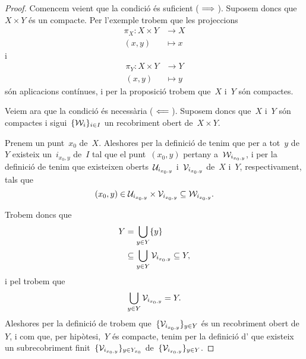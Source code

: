 \documentclass[../../main.tex]{subfiles}
\begin{document}
    \begin{proof}
        Comencem veient que la condició és suficient (\(\implies\)).
        Suposem doncs que~\(X\times Y\) és un compacte.
        Per l'exemple  trobem que les projeccions
        \begin{align*}
            \pi_{X}\colon X\times Y&\longrightarrow X \\
            (x,y)&\longmapsto x
        \end{align*}
        i
        \begin{align*}
            \pi_{Y}\colon X\times Y&\longrightarrow Y \\
            (x,y)&\longmapsto y
        \end{align*}
        són aplicacions contínues, i per la proposició  trobem que~\(X\) i~\(Y\) són compactes.

        Veiem ara que la condició és necessària (\(\impliedby\)).
        Suposem doncs que~\(X\) i~\(Y\) són compactes i sigui~\(\{\mathcal{W}_{i}\}_{i\in I}\) un recobriment obert de~\(X\times Y\).

        Prenem un punt~\(x_{0}\) de~\(X\).
        Aleshores per la definició de  tenim que per a tot~\(y\) de~\(Y\) existeix un~\(i_{x_{0},y}\) de~\(I\) tal que el punt~\((x_{0},y)\) pertany a~\(\mathcal{W}_{i_{x_{0},y}}\), i per la definició de  tenim que existeixen oberts~\(\mathcal{U}_{i_{x_{0},y}}\) i~\(\mathcal{V}_{i_{x_{0},y}}\) de~\(X\) i~\(Y\), respectivament, tals que
        \[
            (x_{0},y)\in\mathcal{U}_{i_{x_{0},y}}\times\mathcal{V}_{i_{x_{0},y}}\subseteq\mathcal{W}_{i_{x_{0},y}}.
        \]

        Trobem doncs que
        \begin{align*}
            Y&=\bigcup_{y\in Y}\{y\} \\
            &\subseteq\bigcup_{y\in Y}\mathcal{V}_{i_{x_{0},y}}\subseteq Y,
        \end{align*}
        i pel  trobem que
        \[
            \bigcup_{y\in Y}\mathcal{V}_{i_{x_{0},y}}=Y.
        \]
        Aleshores per la definició de  trobem que~\(\{\mathcal{V}_{i_{x_{0},y}}\}_{y\in Y}\) és un recobriment obert de~\(Y\), i com que, per hipòtesi,~\(Y\) és compacte, tenim per la definició d' que existeix un subrecobriment finit~\(\{\mathcal{V}_{i_{x_{0},y}}\}_{y\in Y_{x_{0}}}\) de~\(\{\mathcal{V}_{i_{x_{0},y}}\}_{y\in Y}\).


\end{proof}
\end{document}
